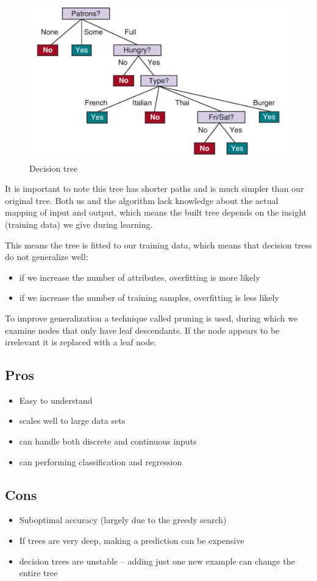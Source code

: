 \documentclass[a4paper,12pt,answers]{article}
\begin{document}
	\begin{figure}[H]
		\centering
		\includegraphics[width=0.7\linewidth]{dec_tree_building2}
		\caption{Decision tree}
		\label{fig:dectreebuilding2}
	\end{figure}
	It is important to note this tree has shorter paths and is much simpler than our original tree. Both us and the algorithm lack knowledge about the actual mapping of input and output, which means the built tree depends on the insight (training data) we give during learning.
	
	This means the tree is fitted to our training data, which means that decision tress do not generalize well:
	\begin{itemize}
		\item if we increase the number of attributes, overfitting is more likely
		\item if we increase the number of training samples, overfitting is less likely
	\end{itemize}
	
	To improve generalization a technique called pruning is used, during which we examine nodes that only have leaf descendants. If the node appears to be irrelevant it is replaced with a leaf node.
	
	\subsection{Pros}
	\begin{itemize}
		\item Easy to understand
		\item scales well to large data sets
		\item can handle both discrete and continuous inputs
		\item can performing classification and regression
	\end{itemize}
	
	\subsection{Cons}
	\begin{itemize}
		\item Suboptimal accuracy (largely due to the greedy search)
		\item If trees are very deep, making a prediction can be expensive 
		\item decision trees are unstable – adding just one new example can change the entire tree
	\end{itemize}
	
\end{document}
